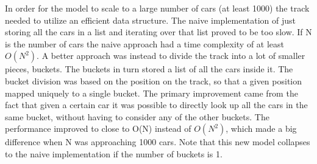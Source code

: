 \documentclass[11pt,a4paper,twocolumn]{article}
\begin{document}
In order for the model to scale to a large number of cars (at least 1000) the track needed to utilize an efficient data structure. The naive implementation of just storing all the cars in a list and iterating over that list proved to be too slow. If N is the number of cars the naive approach had a time complexity of at least $O(N^2)$. A better approach was instead to divide the track into a lot of smaller pieces, buckets. The buckets in turn stored a list of all the cars inside it. The bucket division was based on the position on the track, so that a given position mapped uniquely to a single bucket. The primary improvement came from the fact that given a certain car it was possible to directly look up all the cars in the same bucket, without having to consider any of the other buckets. The performance improved to close to O(N) instead of $O(N^2)$, which made a big difference when N was approaching 1000 cars. Note that this new model collapses to the naive implementation if the number of buckets is 1.
\end{document}
